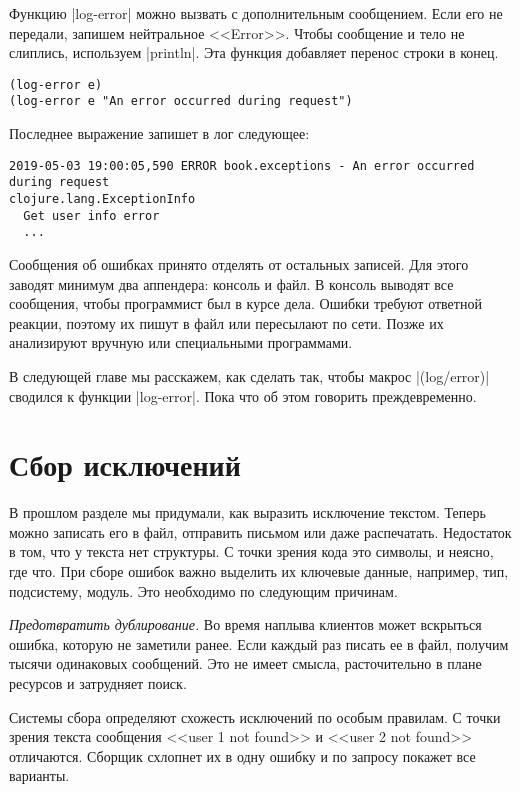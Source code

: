 Функцию \spverb|log-error| можно вызвать с дополнительным сообщением. Если его
не передали, запишем нейтральное <<Error>>. Чтобы сообщение и тело не слиплись,
используем \spverb|println|. Эта функция добавляет перенос строки в конец.

\begin{verbatim}
(log-error e)
(log-error e "An error occurred during request")
\end{verbatim}

Последнее выражение запишет в лог следующее:

\begin{verbatim}
2019-05-03 19:00:05,590 ERROR book.exceptions - An error occurred during request
clojure.lang.ExceptionInfo
  Get user info error
  ...
\end{verbatim}

Сообщения об ошибках принято отделять от остальных записей. Для этого заводят
минимум два аппендера: консоль и файл. В консоль выводят все сообщения, чтобы
программист был в курсе дела. Ошибки требуют ответной реакции, поэтому их пишут
в файл или пересылают по сети. Позже их анализируют вручную или специальными
программами.

В следующей главе мы расскажем, как сделать так, чтобы макрос
\spverb|(log/error)| сводился к функции \spverb|log-error|. Пока что об этом
говорить преждевременно.

\section{Сбор исключений}

В прошлом разделе мы придумали, как выразить исключение текстом. Теперь можно
записать его в файл, отправить письмом или даже распечатать. Недостаток в том,
что у текста нет структуры. С точки зрения кода это символы, и неясно, где что.
При сборе ошибок важно выделить их ключевые данные, например, тип, подсистему,
модуль. Это необходимо по следующим причинам.

\emph{Предотвратить дублирование.} Во время наплыва клиентов может вскрыться
ошибка, которую не заметили ранее. Если каждый раз писать ее в файл, получим
тысячи одинаковых сообщений. Это не имеет смысла, расточительно в плане ресурсов
и затрудняет поиск.

Системы сбора определяют схожесть исключений по особым правилам. С точки зрения
текста сообщения <<user 1 not found>> и <<user 2 not found>> отличаются. Сборщик
схлопнет их в одну ошибку и по запросу покажет все варианты.

